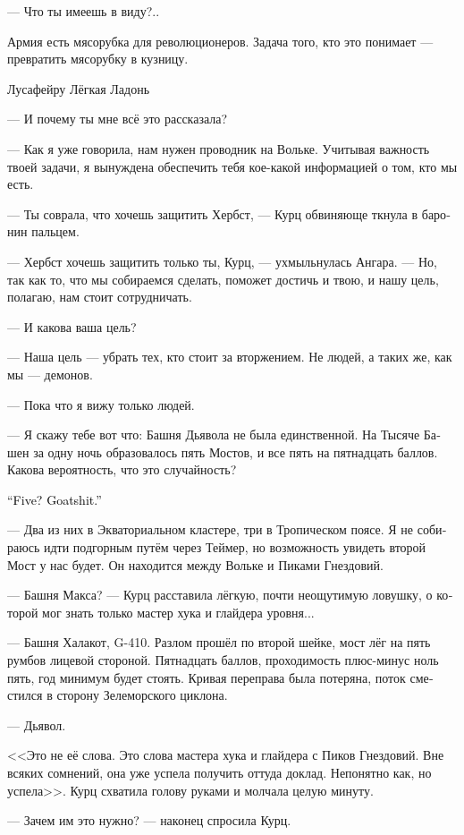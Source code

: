 \documentclass[a4paper,12pt,fleqn]{book}\usepackage{cooltooltips}\usepackage{polyglossia}\setdefaultlanguage[babelshorthands=true]{russian}\setotherlanguage{english}\defaultfontfeatures{Ligatures=TeX,Mapping=tex-text} \usepackage{xcolor}\definecolor{lightgray}{HTML}{bbbbbb}\color{lightgray}\newcommand{\ml}[3]{\textenglish{\textcolor{black}{#3}}}
\newcommand{\asterism}{\vspace{1em}{\centering\Large\bfseries$\ast~\ast~\ast$\par}\vspace{1em}}
\begin{document}
--- Что ты имеешь в виду?..

\asterism

\epigraph{
Армия есть мясорубка для революционеров.
Задача того, кто это понимает --- превратить мясорубку в кузницу.}
{Лусафейру Лёгкая Ладонь}

--- И почему ты мне всё это рассказала?

--- Как я уже говорила, нам нужен проводник на Вольке.
Учитывая важность твоей задачи, я вынуждена обеспечить тебя кое-какой информацией о том, кто мы есть.

--- Ты соврала, что хочешь защитить Хербст, --- Курц обвиняюще ткнула в баронин пальцем.

--- Хербст хочешь защитить только ты, Курц, --- ухмыльнулась Ангара.
--- Но, так как то, что мы собираемся сделать, поможет достичь и твою, и нашу цель, полагаю, нам стоит сотрудничать.

--- И какова ваша цель?

--- Наша цель --- убрать тех, кто стоит за вторжением.
Не людей, а таких же, как мы --- демонов.

--- Пока что я вижу только людей.

--- Я скажу тебе вот что: Башня Дьявола не была единственной.
На Тысяче Башен за одну ночь образовалось пять Мостов, и все пять на пятнадцать баллов.
Какова вероятность, что это случайность?

\ml{$0$}
{--- Пять?}
{``Five?}
\ml{$0$}
{Не верю.}
{Goatshit.''}

--- Два из них в Экваториальном кластере, три в Тропическом поясе.
Я не собираюсь идти подгорным путём через Теймер, но возможность увидеть второй Мост у нас будет.
Он находится между Вольке и Пиками Гнездовий.

--- Башня Макса? --- Курц расставила лёгкую, почти неощутимую ловушку, о которой мог знать только мастер хука и глайдера уровня...

--- Башня Халакот, G-410.
Разлом прошёл по второй шейке, мост лёг на пять румбов лицевой стороной.
Пятнадцать баллов, проходимость плюс-минус ноль пять, год минимум будет стоять.
Кривая переправа была потеряна, поток сместился в сторону Зелеморского циклона.

--- Дьявол.

<<Это не её слова.
Это слова мастера хука и глайдера с Пиков Гнездовий.
Вне всяких сомнений, она уже успела получить оттуда доклад.
Непонятно как, но успела>>.
Курц схватила голову руками и молчала целую минуту.

--- Зачем им это нужно? --- наконец спросила Курц.
\end{document}
